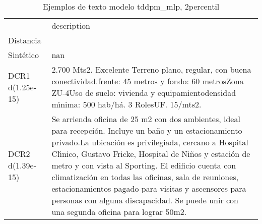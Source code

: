\begin{table}[H]
\centering
\fontsize{10}{14}\selectfont
\caption{Ejemplos de texto modelo tddpm\_mlp, 2percentil}
\label{table-example-economicos-b-2-tddpm_mlp-2p-text}
\begin{tabular}{|l|m{35em}|}
\hline
\rowcolor[gray]{0.8}
 & description \\
Distancia &  \\
\hline Sintético & nan \\
\hline DCR1 d(1.25e-15) & 2.700 Mts2. Excelente Terreno plano, regular, con buena conectividad.frente: 45 metros y fondo: 60 metrosZona ZU-4Uso de suelo: vivienda y equipamientodensidad m{\'\i}nima: 500 hab/h\'a. 3 RolesUF. 15/mts2. \\
\hline DCR2 d(1.39e-15) & Se arrienda oficina de 25 m2  con dos ambientes, ideal para recepci\'on. Incluye un ba\~no y un estacionamiento privado.La ubicaci\'on es privilegiada, cercano a Hospital Cl{\'\i}nico,  Gustavo Fricke,  Hospital de Ni\~nos y estaci\'on de metro y con vista al Sporting. El edificio cuenta con climatizaci\'on en todas las oficinas, sala de reuniones, estacionamientos pagado para visitas y ascensores para personas con alguna discapacidad. Se puede unir con una segunda oficina para lograr 50m2. \\
\hline
\end{tabular}
\end{table}
